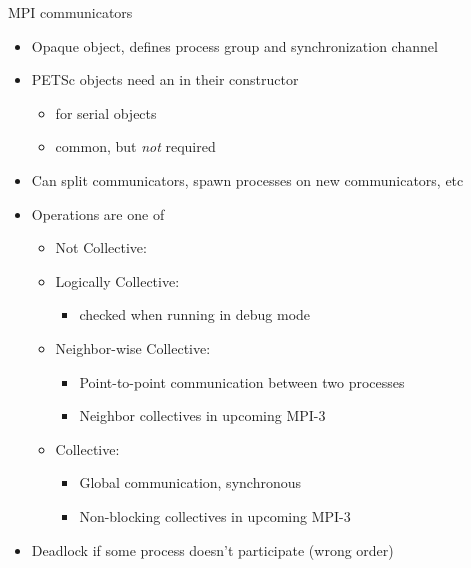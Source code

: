 \begin{frame}{MPI communicators}
  \begin{itemize}
  \item Opaque object, defines process group and synchronization channel
  \item PETSc objects need an  in their constructor
    \begin{itemize}
    \item {} for serial objects
    \item {} common, but \emph{not} required
    \end{itemize}
  \item Can split communicators, spawn processes on new communicators, etc
  \item Operations are one of
    \begin{itemize}
    \item Not Collective: 
    \item Logically Collective: 
      \begin{itemize}
      \item checked when running in debug mode
      \end{itemize}
    \item Neighbor-wise Collective: 
      \begin{itemize}
      \item Point-to-point communication between two processes
      \item Neighbor collectives in upcoming MPI-3
      \end{itemize}
    \item Collective: 
      \begin{itemize}
      \item Global communication, synchronous
      \item Non-blocking collectives in upcoming MPI-3
      \end{itemize}
    \end{itemize}
  \item Deadlock if some process doesn't participate (\eg wrong order)
  \end{itemize}
\end{frame}

